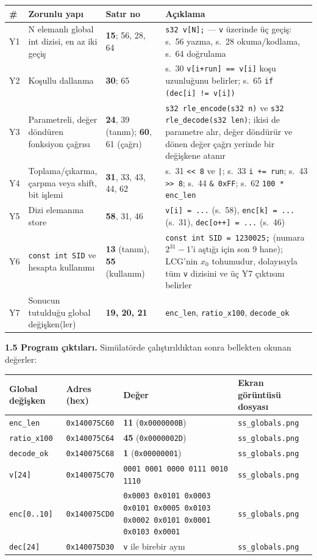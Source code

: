 \documentclass[11pt,a4paper]{article}
\newcommand{\tl}{\texttt}
\newcommand{\hd}[1]{\cellcolor{hdr}#1}
\begin{document}
\begin{longtable}{|p{0.9cm}|p{4.3cm}|p{2.2cm}|p{7.3cm}|}
\hline
\hd{\#} & \hd{Zorunlu yapı} & \hd{Satır no} & \hd{Açıklama}\\
\hline
\endhead
Y1 & N elemanlı global int dizisi, en az iki geçiş & \textbf{15}; 56, 28, 64 & \tl{s32 v[N];} --- \tl{v} üzerinde üç geçiş: s.~56 yazma, s.~28 okuma/kodlama, s.~64 doğrulama\\
\hline
Y2 & Koşullu dallanma & \textbf{30}; 65 & s.~30 \tl{v[i+run] == v[i]} koşu uzunluğunu belirler; s.~65 \tl{if (dec[i] != v[i])}\\
\hline
Y3 & Parametreli, değer döndüren fonksiyon çağrısı & \textbf{24}, 39 (tanım); \textbf{60}, 61 (çağrı) & \tl{s32 rle\_encode(s32 n)} ve \tl{s32 rle\_decode(s32 len)}; ikisi de parametre alır, değer döndürür ve dönen değer çağrı yerinde bir değişkene atanır\\
\hline
Y4 & Toplama/çıkarma, çarpma veya shift, bit işlemi & \textbf{31}, 33, 43, 44, 62 & s.~31 \tl{<< 8} ve \tl{|}; s.~33 \tl{i += run}; s.~43 \tl{>> 8}; s.~44 \tl{\& 0xFF}; s.~62 \tl{100 * enc\_len}\\
\hline
Y5 & Dizi elemanına store & \textbf{58}, 31, 46 & \tl{v[i] = ...} (s.~58), \tl{enc[k] = ...} (s.~31), \tl{dec[o++] = ...} (s.~46)\\
\hline
Y6 & \tl{const int SID} ve hesapta kullanımı & \textbf{13} (tanım), \textbf{55} (kullanım) & \tl{const int SID = 1230025;} (numara $2^{31}-1$'i aştığı için son 9 hane); LCG'nin $x_0$ tohumudur, dolayısıyla tüm \tl{v} dizisini ve üç Y7 çıktısını belirler\\
\hline
Y7 & Sonucun tutulduğu global değişken(ler) & \textbf{19, 20, 21} & \tl{enc\_len}, \tl{ratio\_x100}, \tl{decode\_ok}\\
\hline
\end{longtable}

\textbf{1.5 Program çıktıları.} Simülatörde çalıştırıldıktan sonra bellekten okunan değerler:

\begin{longtable}{|p{3.0cm}|p{2.8cm}|p{5.6cm}|p{3.3cm}|}
\hline
\hd{Global değişken} & \hd{Adres (hex)} & \hd{Değer} & \hd{Ekran görüntüsü dosyası}\\
\hline
\endhead
\tl{enc\_len} & \tl{0x140075C60} & \textbf{11} \quad(\tl{0x0000000B}) & \tl{ss\_globals.png}\\
\hline
\tl{ratio\_x100} & \tl{0x140075C64} & \textbf{45} \quad(\tl{0x0000002D}) & \tl{ss\_globals.png}\\
\hline
\tl{decode\_ok} & \tl{0x140075C68} & \textbf{1} \quad(\tl{0x00000001}) & \tl{ss\_globals.png}\\
\hline
\tl{v[24]} & \tl{0x140075C70} & \tl{0001 0001 0000 0111 0010 1110} & \tl{ss\_globals.png}\\
\hline
\tl{enc[0..10]} & \tl{0x140075CD0} & \tl{0x0003 0x0101 0x0003 0x0101 0x0005 0x0103 0x0002 0x0101 0x0001 0x0103 0x0001} & \tl{ss\_globals.png}\\
\hline
\tl{dec[24]} & \tl{0x140075D30} & \tl{v} ile birebir aynı & \tl{ss\_globals.png}\\
\hline
\end{longtable}
\end{document}
